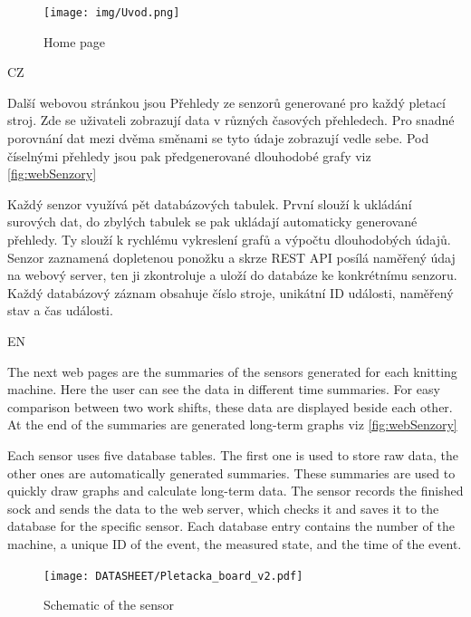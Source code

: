 \documentclass[12pt, a4paper]{article}
\begin{document}
\begin{figure}[t]
    \centering
    \texttt{[image: img/Uvod.png]}
    \caption{Home page}
    \label{fig:webUvod}
\end{figure}

CZ

Další webovou stránkou jsou Přehledy ze senzorů generované pro každý pletací stroj.
Zde se uživateli zobrazují data v různých časových přehledech.
Pro snadné porovnání dat mezi dvěma směnami se tyto údaje zobrazují vedle sebe.
Pod číselnými přehledy jsou pak předgenerované dlouhodobé grafy viz \ref{fig:webSenzory}

Každý senzor využívá pět databázových tabulek. První slouží k ukládání surových dat, do zbylých tabulek se pak ukládají automaticky generované přehledy.
Ty slouží k rychlému vykreslení grafů a výpočtu dlouhodobých údajů.
Senzor zaznamená dopletenou ponožku a skrze REST API posílá naměřený údaj na webový server, ten ji zkontroluje a uloží do databáze ke konkrétnímu senzoru.
Každý databázový záznam obsahuje číslo stroje, unikátní ID události, naměřený stav a čas události.

EN

The next web pages are the summaries of the sensors generated for each knitting machine.
Here the user can see the data in different time summaries.
For easy comparison between two work shifts, these data are displayed beside each other.
At the end of the summaries are generated long-term graphs viz \ref{fig:webSenzory}

Each sensor uses five database tables. The first one is used to store raw data, the other ones are automatically generated summaries.
These summaries are used to quickly draw graphs and calculate long-term data.
The sensor records the finished sock and sends the data to the web server, which checks it and saves it to the database for the specific sensor.
Each database entry contains the number of the machine, a unique ID of the event, the measured state, and the time of the event.

% 
\begin{figure}[htbp]
    \centering
    \texttt{[image: DATASHEET/Pletacka\_board\_v2.pdf]}
    \caption{Schematic of the sensor}
    \label{fig:Schemav1}
\end{figure}
\end{document}
